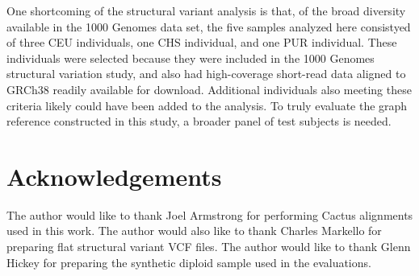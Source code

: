 One shortcoming of the structural variant analysis is that, of the broad diversity available in the 1000 Genomes data set, the five samples analyzed here consistyed of three CEU individuals, one CHS individual, and one PUR individual. These individuals were selected because they were included in the 1000 Genomes structural variation study, and also had high-coverage short-read data aligned to GRCh38 readily available for download. Additional individuals also meeting these criteria likely could have been added to the analysis. To truly evaluate the graph reference constructed in this study, a broader panel of test subjects is needed.

\section{Acknowledgements}

The author would like to thank Joel Armstrong for performing Cactus alignments used in this work. The author would also like to thank Charles Markello for preparing flat structural variant VCF files. The author would like to thank Glenn Hickey for preparing the synthetic diploid sample used in the evaluations.

        
            
